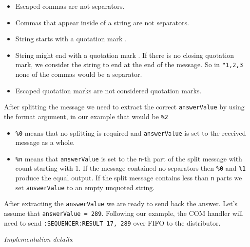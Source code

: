 \begin{itemize}
{{\begin{itemize}
				\item Escaped commas \highlight{\textbackslash ,} are not separators.
				\item Commas that appear inside of a string are not separators.
				\item String starts with a quotation mark .
				\item String might end with a quotation mark . If there is no closing quotation mark, we consider the string to end at the end of the message. So in \texttt{"1,2,3} none of the commas would be a separator.
				\item Escaped quotation marks  are not considered quotation marks.
			\end{itemize}
		}
		\item{
			After splitting the message we need to extract the correct \texttt{answerValue} by using the format argument, in our example that would be \texttt{\%2}
			\begin{itemize}
				\item \texttt{\%0} means that no splitting is required and \texttt{answerValue} is set to the received message as a whole.
				\item \texttt{\%n} means that \texttt{answerValue} is set to the \texttt{n}-th part of the split message with count starting with 1. If the message contained no separators then \texttt{\%0} and \texttt{\%1} produce the equal output. If the split message contains less than \texttt{n} parts we set \texttt{answerValue} to an empty unquoted string.
			\end{itemize}
		}
		\item After extracting the \texttt{answerValue} we are ready to send back the answer. Let's assume that \texttt{answerValue = 289}. Following our example, the COM handler will need to send \texttt{:SEQUENCER:RESULT 17, 289} over FIFO to the distributor.
	}
\end{itemize}

\textit{Implementation details}:

